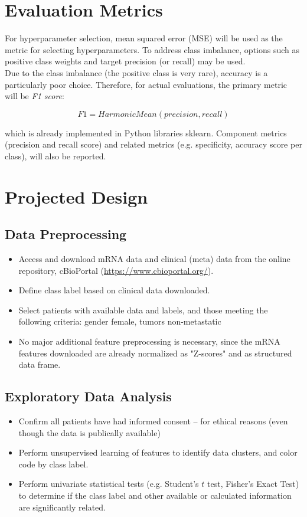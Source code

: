 \documentclass[11pt]{diazessay}
\begin{document}
\section{Evaluation Metrics}

For hyperparameter selection, mean squared error (MSE) will be used as the metric for selecting hyperparameters. To address class imbalance, options such as positive class weights and target precision (or recall) may be used. \\

Due to the class imbalance (the positive class is very rare), accuracy is a particularly poor choice. Therefore, for actual evaluations, the primary metric will be \textit{F1 score}:

$$F1 = HarmonicMean(precision, recall)$$

which is already implemented in Python libraries sklearn. Component metrics (precision and recall score) and related metrics (e.g. specificity, accuracy score per class), will also be reported.


\section{Projected Design}

\subsection{Data Preprocessing}

\begin{itemize}
	\item Access and download mRNA data and clinical (meta) data from the online repository, cBioPortal (\url{https://www.cbioportal.org/}).
	\item Define class label based on clinical data downloaded.
	\item Select patients with available data and labels, and those meeting the following criteria: gender female, tumors non-metastatic
	\item No major additional feature preprocessing is necessary, since the mRNA features downloaded are already normalized as "Z-scores" and as structured data frame.
\end{itemize}

\subsection{Exploratory Data Analysis}

\begin{itemize}
	\item Confirm all patients have had informed consent -- for ethical reasons (even though the data is publically available)
	\item Perform unsupervised learning of features to identify data clusters, and color code by class label.
	\item Perform univariate statistical tests (e.g. Student's $t$ test, Fisher's Exact Test) to determine if the class label and other available or calculated information are significantly related.
\end{itemize}
\end{document}
